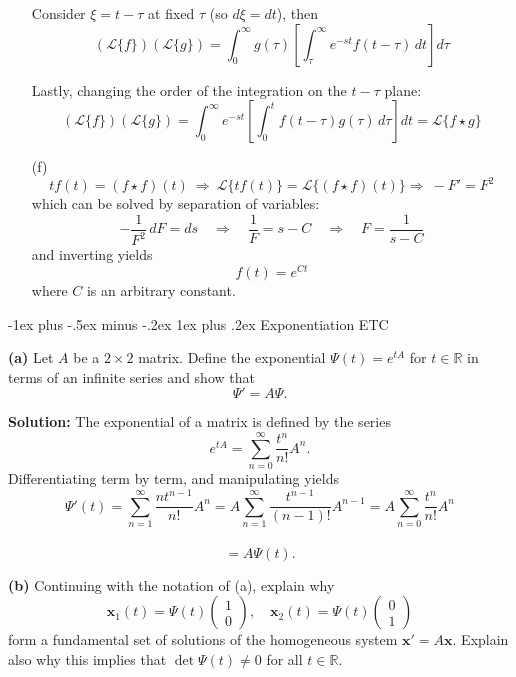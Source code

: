 \documentclass[10pt,landscape]{article}
\makeatletter
\newcommand{\mbf}{\mathbf}
\renewcommand{\subsubsection}{\@startsection{subsubsection}{3}{0mm}%
                                {-1ex plus -.5ex minus -.2ex}%
                                {1ex plus .2ex}%
                                {\normalfont\small\bfseries}}
\makeatother
\begin{document}
\begin{multicols}{2}
\begin{enumerate}
Consider \( \xi = t - \tau \) at fixed \( \tau \) (so \( d\xi = dt \)), then\\
\[
(\mathcal{L}\{ f \})(\mathcal{L}\{ g \}) = \int_0^\infty g(\tau) \left[ \int_\tau^\infty e^{-st} f(t - \tau) \, dt \right] d\tau
\]

Lastly, changing the order of the integration on the \( t-\tau \) plane:\\
\[
(\mathcal{L}\{ f \})(\mathcal{L}\{ g \}) = \int_0^\infty e^{-st} \left[ \int_0^t f(t - \tau) g(\tau) \, d\tau \right] dt = \mathcal{L} \{ f \star g \}
\]

\item[(f)] 
\[
t f(t) = (f \star f)(t) \ \Rightarrow \ \mathcal{L} \{ t f(t) \} = \mathcal{L} \{ (f \star f)(t) \} \Rightarrow \ -F' = F^2
\]
which can be solved by separation of variables:\\
\[
- \frac{1}{F^2} \, dF = ds \quad \Rightarrow \quad \frac{1}{F} = s - C \quad \Rightarrow \quad F = \frac{1}{s - C}
\]
and inverting yields
\[
f(t) = e^{Ct}
\]
where \( C \) is an arbitrary constant.

\end{enumerate}
\bigskip
\bigskip
\bigskip
\subsubsection{Exponentiation ETC}

 \textbf{(a)} Let \( A \) be a \( 2 \times 2 \) matrix. Define the exponential \( \Psi(t) = e^{tA} \) for \( t \in \mathbb{R} \) in terms of an infinite series and show that\\
\[
\Psi' = A\Psi.
\]

\textbf{Solution:}  
The exponential of a matrix is defined by the series\\
\[
e^{tA} = \sum_{n=0}^{\infty} \frac{t^n}{n!} A^n.
\]
Differentiating term by term, and manipulating yields\\
\[
\Psi'(t) = \sum_{n=1}^{\infty} \frac{n t^{n-1}}{n!} A^n = A \sum_{n=1}^{\infty} \frac{t^{n-1}}{(n-1)!} A^{n-1} = A \sum_{n=0}^{\infty} \frac{t^n}{n!} A^n\]\\\[ = A \Psi(t).
\]

\textbf{(b)} Continuing with the notation of (a), explain why\\
\[
\mbf{x}_1(t) = \Psi(t) \begin{pmatrix} 1 \\ 0 \end{pmatrix}, \quad \mbf{x}_2(t) = \Psi(t) \begin{pmatrix} 0 \\ 1 \end{pmatrix}
\]
form a fundamental set of solutions of the homogeneous system \( \mbf{x}' = A \mbf{x} \). Explain also why this implies that \( \det \Psi(t) \neq 0 \) for all \( t \in \mathbb{R} \).


\end{multicols}
\end{document}
